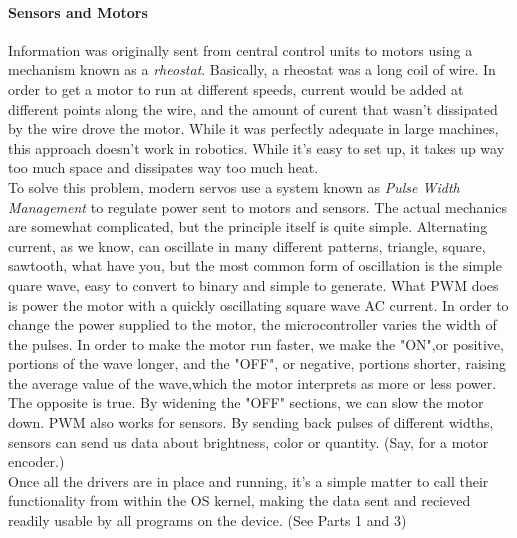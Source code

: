 \documentclass[english]{article}
\begin{document}
\paragraph{Sensors and Motors}
Information was originally sent from central control units to motors using a mechanism known as a {\it rheostat}. Basically, a rheostat was a long coil of wire. In order to get a motor to run at different speeds, current would be added at different points along the wire, and the amount of curent that wasn't dissipated by the wire drove the motor. While it was perfectly adequate in large machines, this approach doesn't work in robotics. While it's easy to set up, it takes up way too much space and dissipates way too much heat. 
\break
\\To solve this problem, modern servos use a system known as {\it Pulse Width Management} to regulate power sent to motors and sensors. The actual mechanics are somewhat complicated, but the principle itself is quite simple. Alternating current, as we know, can oscillate in many different patterns, triangle, square, sawtooth, what have you, but the most common form of oscillation is the simple quare wave, easy to convert to binary and simple to generate. What PWM does is power the motor with a quickly oscillating square wave AC current. In order to change the power supplied to the motor, the microcontroller varies the width of the pulses. In order to make the motor run faster, we make the "ON",or positive, portions of the wave longer, and the "OFF", or negative, portions shorter, raising the average value of the wave,which the motor interprets as more or less power. The opposite is true. By widening the "OFF" sections, we can slow the motor down. PWM also works for sensors. By sending back pulses of different widths, sensors can send us data about brightness, color or quantity. (Say, for a motor encoder.)
\break
\\Once all the drivers are in place and running, it's a simple matter to call their functionality from within the OS kernel, making the data sent and recieved readily usable by all programs on the device. (See Parts 1 and 3)
\end{document}
